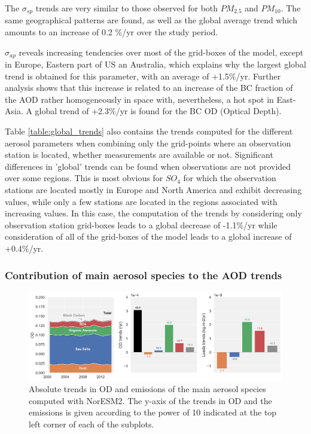 \documentclass[journal abbreviation, manuscript]{copernicus}
\begin{document}
The $\sigma_{sp}$ trends are very similar to those observed for both $PM_{2.5}$ and $PM_{10}$. The same geographical patterns are found, as well as the global average trend which amounts to an increase of 0.2 \%/yr over the study period.

$\sigma_{ap}$ reveals increasing tendencies over most of the grid-boxes of the model, except in Europe, Eastern part of US an Australia, which explains why the largest global trend is obtained for this parameter, with an average of +1.5\%/yr. Further analysis shows that this increase is related to an increase of the BC fraction of the AOD rather homogeneously in space with, nevertheless, a hot spot in East-Asia. A global trend of +2.3\%/yr is found for the BC OD (Optical Depth).

Table \ref{table:global_trends} also contains the trends computed for the different aerosol parameters when combining only the grid-points where an observation station is located, whether measurements are available or not. Significant differences in 'global' trends can be found when observations are not provided over some regions. This is most obvious for $SO_{4}$ for which the observation stations are located mostly in Europe and North America and exhibit decreasing values, while only a few stations are located in the regions associated with increasing values. In this case, the computation of the trends by considering only observation station grid-boxes leads to a global decrease of -1.1\%/yr while consideration of all of the grid-boxes of the model leads to a global increase of +0.4\%/yr.


\subsubsection{Contribution of main aerosol species to the AOD trends}

\begin{figure}[t]
 \includegraphics[width=16cm]{../scripts/figs/abs_species_trends.png}
 \caption{Absolute trends in OD and emissions of the main aerosol species computed with NorESM2. The y-axis of the trends in OD and the emissions is given according to the power of 10 indicated at the top left corner of each of the subplots.}
 \label{fig:species}
\end{figure}
\end{document}

